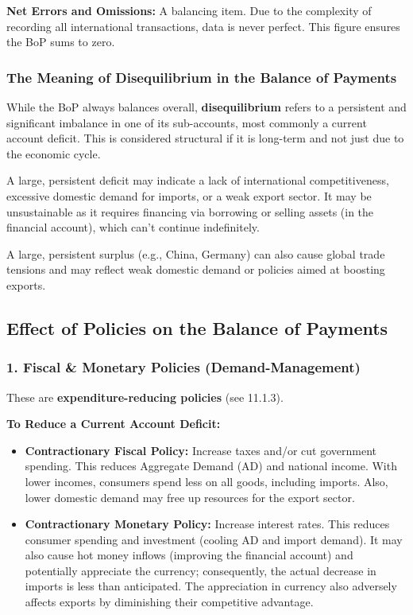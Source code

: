 \documentclass[11pt, a4paper, twoside]{book}
\begin{document}
\textbf{Net Errors and Omissions:} A balancing item. Due to the complexity of recording all international transactions, data is never perfect. This figure ensures the BoP sums to zero.

\subsubsection{The Meaning of Disequilibrium in the Balance of Payments}

While the BoP always balances overall, \textbf{disequilibrium} refers to a persistent and significant imbalance in one of its sub-accounts, most commonly a current account deficit. This is considered structural if it is long-term and not just due to the economic cycle.

A large, persistent deficit may indicate a lack of international competitiveness, excessive domestic demand for imports, or a weak export sector. It may be unsustainable as it requires financing via borrowing or selling assets (in the financial account), which can't continue indefinitely.

A large, persistent surplus (e.g., China, Germany) can also cause global trade tensions and may reflect weak domestic demand or policies aimed at boosting exports.

\subsection{Effect of Policies on the Balance of Payments}

\subsubsection{1. Fiscal \& Monetary Policies (Demand-Management)}

These are \textbf{expenditure-reducing policies} (see 11.1.3).

\textbf{To Reduce a Current Account Deficit:}
\begin{itemize}
  \item \textbf{Contractionary Fiscal Policy:} Increase taxes and/or cut government spending. This reduces Aggregate Demand (AD) and national income. With lower incomes, consumers spend less on all goods, including imports. Also, lower domestic demand may free up resources for the export sector.
  \item \textbf{Contractionary Monetary Policy:} Increase interest rates. This reduces consumer spending and investment (cooling AD and import demand). It may also cause hot money inflows (improving the financial account) and potentially appreciate the currency; consequently, the actual decrease in imports is less than anticipated. The appreciation in currency also adversely affects exports by diminishing their competitive advantage.
\end{itemize}
\end{document}
